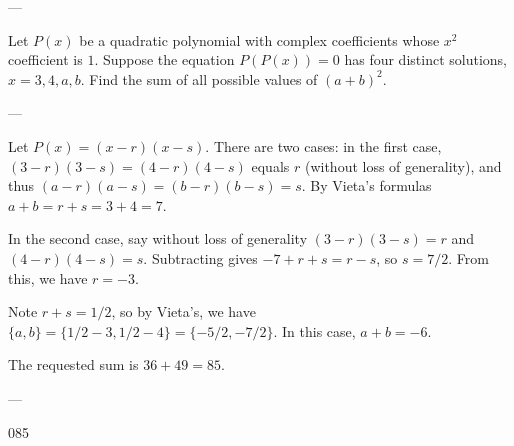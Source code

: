 
---

Let $P(x)$ be a quadratic polynomial with complex coefficients whose $x^2$ coefficient is $1$. Suppose the equation $P(P(x))=0$ has four distinct solutions, $x=3,4,a,b$. Find the sum of all possible values of $(a+b)^2$.

---

Let $P(x)=(x-r)(x-s)$. There are two cases: in the first case, $(3-r)(3-s)=(4-r)(4-s)$ equals $r$ (without loss of generality), and thus $(a-r)(a-s)=(b-r)(b-s)=s$. By Vieta's formulas $a+b=r+s=3+4=7$.

In the second case, say without loss of generality $(3-r)(3-s)=r$ and $(4-r)(4-s)=s$. Subtracting gives $-7+r+s=r-s$, so $s=7/2$. From this, we have $r=-3$.

Note $r+s=1/2$, so by Vieta's, we have $\{a,b\}=\{1/2-3,1/2-4\}=\{-5/2,-7/2\}$. In this case, $a+b=-6$.

The requested sum is $36+49=85$.

---

085
